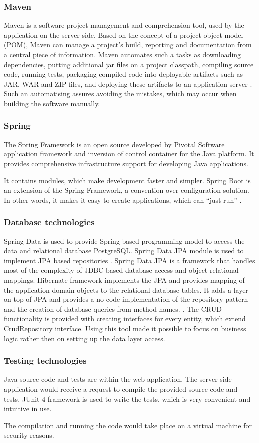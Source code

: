 \subsubsection{Maven}
Maven is a software project management and comprehension tool, used by the application on the server side. Based on the concept of a project object model (POM), Maven can manage a project's build, reporting and documentation from a central piece of information. Maven automates such a tasks as downloading dependencies, putting additional jar files on a project classpath, compiling source code, running tests, packaging compiled code into deployable artifacts such as JAR, WAR and ZIP files, and deploying these artifacts to an application server \cite{maven}. Such an automatising assures avoiding the mistakes, which may occur when building the software manually.

\subsubsection{Spring}
The Spring Framework is an open source developed by Pivotal Software application framework and inversion of control container for the Java platform. It provides comprehensive infrastructure support for developing Java applications. 

It contains modules, which make development faster and simpler. Spring Boot is an extension of the Spring Framework, a convention-over-configuration solution. In other words, it makes it easy to create applications, which can ``just run'' \cite{spring_boot}.

\subsubsection{Database technologies}
Spring Data is used to provide Spring-based programming model to access the data and relational database PostgreSQL. Spring Data JPA module is used to implement JPA based repositories \cite{spring_data}. Spring Data JPA is a framework that handles most of the complexity of JDBC-based database access and object-relational mappings. Hibernate framework implements the JPA and provides mapping of the application domain objects to the relational database tables. It adds a layer on top of JPA and provides a no-code implementation of the repository pattern and the creation of database queries from method names. \cite[Part VI, Persistence]{jpa}. The CRUD functionality is provided with creating interfaces for every entity, which extend CrudRepository interface. Using this tool made it possible to focus on business logic rather then on setting up the data layer access.

\subsubsection{Testing technologies}
Java source code and tests are within the web application. The server side application would receive a request to compile the provided source code and tests. JUnit 4 framework is used to write the tests, which is very convenient and intuitive in use. 

The compilation and running the code would take place on a virtual machine for security reasons.